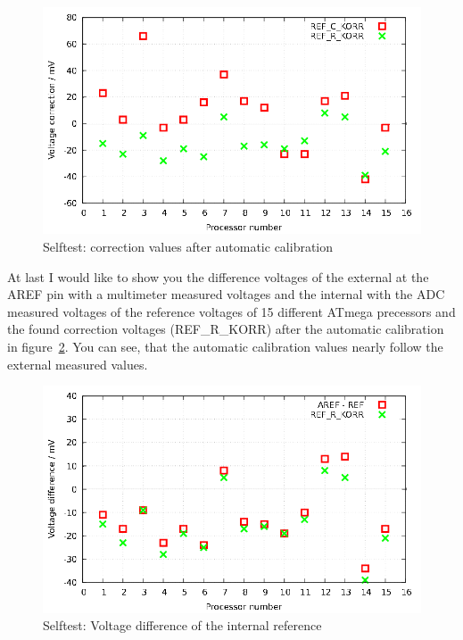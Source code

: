 \begin{figure}[H]
  \centering
  \includegraphics[width=.9\textwidth]{../GNU/SelfTrefKorr.pdf}
  \caption{Selftest: correction values after automatic calibration}
  \label{fig:SelfTrefKorr}
\end{figure}

At last I would like to show you the difference voltages of the external at the
AREF pin with a multimeter measured voltages and the internal with the ADC
measured voltages of the reference voltages of 15 different ATmega precessors
and the found correction voltages (REF\_R\_KORR) after the automatic calibration in
figure~\ref{fig:SelfTrefDiff}.
You can see, that the automatic calibration values nearly follow the external measured values.

\begin{figure}[H]
  \centering
  \includegraphics[width=.9\textwidth]{../GNU/SelfTrefDiff.pdf}
  \caption{Selftest: Voltage difference of the internal reference}
  \label{fig:SelfTrefDiff}
\end{figure}

